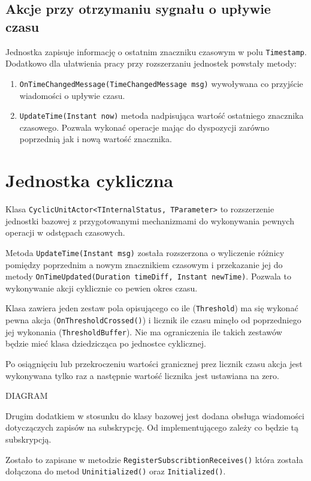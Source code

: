 \subsection*{Akcje przy otrzymaniu sygnału o upływie czasu}
Jednostka zapisuje informację o ostatnim znaczniku czasowym w polu \lstinline{Timestamp}. Dodatkowo dla ułatwienia pracy przy rozszerzaniu jednostek powstały metody:
\begin{enumerate} 
    \item \lstinline{OnTimeChangedMessage(TimeChangedMessage msg)} wywoływana co przyjście wiadomości o upływie czasu.
    \item \lstinline{UpdateTime(Instant now)} metoda nadpisująca wartość ostatniego znacznika czasowego. Pozwala wykonać operacje mając do dyspozycji zarówno poprzednią jak i nową wartość znacznika. 
\end{enumerate}

\section{Jednostka cykliczna} \label{subsec:cyclicUnit}
Klasa \lstinline{CyclicUnitActor<TInternalStatus, TParameter>} to rozszerzenie jednostki bazowej z przygotowanymi mechanizmami do wykonywania pewnych operacji w odstępach czasowych. 

Metoda \lstinline{UpdateTime(Instant msg)} została rozszerzona o wyliczenie różnicy pomiędzy poprzednim a nowym znacznikiem czasowym i przekazanie jej do metody \lstinline{OnTimeUpdated(Duration timeDiff, Instant newTime)}. Pozwala to wykonywanie akcji cyklicznie co pewien okres czasu. 

Klasa zawiera jeden zestaw pola opisującego co ile (\lstinline{Threshold}) ma się wykonać pewna akcja (\lstinline{OnThresholdCrossed()}) i licznik ile czasu minęło od poprzedniego jej wykonania (\lstinline{ThresholdBuffer}). Nie ma ograniczenia ile takich zestawów będzie mieć klasa dziedzicząca po jednostce cyklicznej.

Po osiągnięciu lub przekroczeniu wartości granicznej prez licznik czasu akcja jest wykonywana tylko raz a następnie wartość licznika jest ustawiana na zero.

DIAGRAM

Drugim dodatkiem w stosunku do klasy bazowej jest dodana obsługa wiadomości dotyczączych zapisów na subskrypcję. Od implementującego zależy co będzie tą subskrypcją.

Zostało to zapisane w metodzie \lstinline{RegisterSubscribtionReceives()} która została dołączona do metod \lstinline{Uninitialized()} oraz \lstinline{Initialized()}. 


